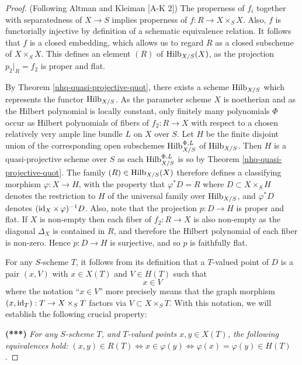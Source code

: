 \begin{proof} (Following Altman and Kleiman [A-K 2])
The properness of $f_i$
together with separatedness of $X\to S$ implies properness of
$f : R \to X\times_SX$.
Also, $f$ is functorially injective by definition
of a schematic equivalence relation.
It follows that $f$ is a closed embedding, which
allows us to regard $R$ as a closed subscheme of $X\times_SX$.
This defines an element $(R)$ of $\operatorname{Hilb}_{X/S}(X)$, as the projection
$p_2|_R = f_2$ is proper and flat.




By Theorem \ref{nhq-quasi-projective-quot},
there exists a scheme $\operatorname{Hilb}_{X/S}$ which represents the
functor $\operatorname{Hilb}_{X/S}$.
As the parameter scheme $X$ is noetherian and as the Hilbert polynomial
is locally constant,
only finitely many polynomials $\Phi$ occur as Hilbert
polynomials of fibers of $f_2: R \to X$ with respect to a
chosen relatively very ample line bundle $L$ on $X$ over $S$.
Let $H$ be the finite disjoint union of the corresponding
open subschemes
$\operatorname{Hilb}_{X/S}^{\Phi,L}$ of $\operatorname{Hilb}_{X/S}$.
Then $H$ is a quasi-projective scheme over $S$ as
each $\operatorname{Hilb}_{X/S}^{\Phi,L}$ is so by
Theorem \ref{nhq-quasi-projective-quot}.
The family $(R) \in  \operatorname{Hilb}_{X/S}(X)$
therefore defines a classifying morphism
${\varphi}: X \to H$, with the property that $\varphi^*D = R$
where $D\subset X\times_SH$ denotes the restriction to $H$
of the universal family over $\operatorname{Hilb}_{X/S}$,
and $\varphi^*D$ denotes $(\operatorname{id}_X\times\,{\varphi})^{-1} D$.
Also, note that the projection $p: D\to H$ is proper and flat.
If $X$ is non-empty then each fiber of $f_2 : R \to X$
is also non-empty as the diagonal $\Delta_X$ is contained in $R$,
and therefore the Hilbert polynomial of each fiber is non-zero.
Hence $p: D\to H$ is surjective, and so $p$ is faithfully flat.


For any $S$-scheme $T$, it follows from its definition that
a $T$-valued point of $D$ is a pair $(x,V)$ with
$x\in X(T)$ and $V \in H(T)$ such that
$$x\in V$$
where the notation ``$x\in V$'' more precisely means that
the graph morphism $(x, \operatorname{id}_T) : T \to X\times_ST$
factors via $V \subset X\times_ST$. With this notation,
we will establish the following crucial property:


\medskip



\textbf{(***)} \textit{For any $S$-scheme $T$, and
$T$-valued points $x,y \in X(T)$,
the following equivalences hold:}
$(x,y) \in R(T) \Leftrightarrow x \in \varphi(y)
\Leftrightarrow \varphi(x) = \varphi(y) \in H(T)$.




\end{proof}
